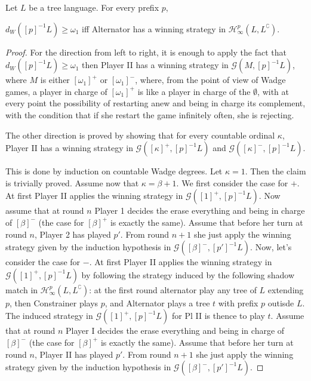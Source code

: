 \begin{proposition}\label{prop:infinity} Let $L$ be a tree language. For every prefix $p$,

$d_W([p]^{-1}L) \geq \omega_1$ iff Alternator has a winning strategy in $\mathcal{H}^p_\infty(L, L^\complement)$. 

\end{proposition}
\begin{proof}
For the direction from left to right, it is enough to apply the fact that $d_W([p]^{-1}L) \geq \omega_1$ then Player II has a winning strategy in $\mathcal{G}(M, [p]^{-1}L)$, where $M$ is either $[\omega_1]^+$ or $[\omega_1]^-$, 
where, from the point of view of Wadge games, a player in charge of $[\omega_1]^+$ 
is like a player in charge of the $\emptyset$, with at every point the possibility of restarting anew and being in charge its complement, with the condition that if she restart the game infinitely often, she is rejecting.
%


The other direction is proved by showing that for every countable ordinal $\kappa$, Player II has a winning strategy in $\mathcal{G}([\kappa]^+, [p]^{-1}L)$ and $\mathcal{G}([\kappa]^-, [p]^{-1}L)$.

This is done by induction on countable Wadge degrees.
Let $\kappa=1$. Then the claim is trivially proved.
Assume now that $\kappa= \beta + 1$. We first consider the case for $+$. At first Player II applies the winning strategy in $\mathcal{G}([1]^+, [p]^{-1}L)$. Now assume that at round $n$ Player 1 decides the erase everything and being in charge of $[\beta]^-$ (the case for $[\beta]^+$ is exactly the same). Assume that before her turn at round $n$, Player 2 has played $p'$. From round $n+1$ she just apply the winning strategy given by the induction hypothesis in $\mathcal{G}([\beta]^-, [p']^{-1}L)$. Now, let's consider the case for $-$. At first Player II applies the winning strategy in $\mathcal{G}([1]^+, [p]^{-1}L)$ by following the strategy induced by the following shadow match in $\mathcal{H}^p_\infty(L, L^\complement)$: at the first round alternator play any tree of $L$ extending $p$, then Constrainer plays $p$, and Alternator plays a tree $t$ with prefix $p$ outisde $L$. The induced strategy in $\mathcal{G}([1]^+, [p]^{-1}L)$ for Pl II is thence to play $t$. 
Assume that at round $n$ Player I decides the erase everything and being in charge of $[\beta]^-$ (the case for $[\beta]^+$ is exactly the same). Assume that before her turn at round $n$, Player II has played $p'$. From round $n+1$ she just apply the winning strategy given by the induction hypothesis in $\mathcal{G}([\beta]^-, [p']^{-1}L)$.
\end{proof}

